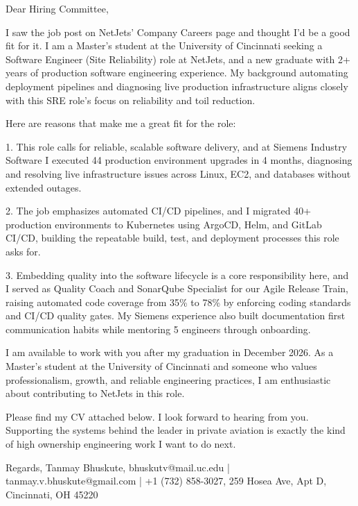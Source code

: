 \documentclass[11pt, letterpaper]{article}
\begin{document}
Dear Hiring Committee,

I saw the job post on NetJets' Company Careers page and thought I'd be a good fit for it. I am a Master's student at the University of Cincinnati seeking a Software Engineer (Site Reliability) role at NetJets, and a new graduate with 2+ years of production software engineering experience. My background automating deployment pipelines and diagnosing live production infrastructure aligns closely with this SRE role's focus on reliability and toil reduction.

Here are reasons that make me a great fit for the role:

1. This role calls for reliable, scalable software delivery, and at Siemens Industry Software I executed 44 production environment upgrades in 4 months, diagnosing and resolving live infrastructure issues across Linux, EC2, and databases without extended outages.

2. The job emphasizes automated CI/CD pipelines, and I migrated 40+ production environments to Kubernetes using ArgoCD, Helm, and GitLab CI/CD, building the repeatable build, test, and deployment processes this role asks for.

3. Embedding quality into the software lifecycle is a core responsibility here, and I served as Quality Coach and SonarQube Specialist for our Agile Release Train, raising automated code coverage from 35\% to 78\% by enforcing coding standards and CI/CD quality gates. My Siemens experience also built documentation first communication habits while mentoring 5 engineers through onboarding.

I am available to work with you after my graduation in December 2026. As a Master's student at the University of Cincinnati and someone who values professionalism, growth, and reliable engineering practices, I am enthusiastic about contributing to NetJets in this role.

Please find my CV attached below. I look forward to hearing from you. Supporting the systems behind the leader in private aviation is exactly the kind of high ownership engineering work I want to do next.

Regards,
Tanmay Bhuskute,
bhuskutv@mail.uc.edu | tanmay.v.bhuskute@gmail.com | +1 (732) 858-3027,
259 Hosea Ave, Apt D, Cincinnati, OH 45220
\end{document}
